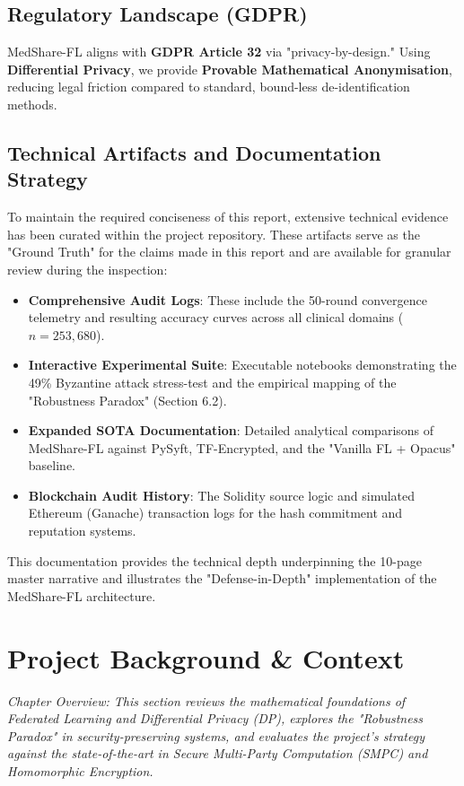 \documentclass[10pt, a4paper, twocolumn]{article}
\begin{document}
\subsection{Regulatory Landscape (GDPR)}
MedShare-FL aligns with \textbf{GDPR Article 32} via "privacy-by-design." Using \textbf{Differential Privacy}, we provide \textbf{Provable Mathematical Anonymisation}, reducing legal friction compared to standard, bound-less de-identification methods.

\subsection{Technical Artifacts and Documentation Strategy}
To maintain the required conciseness of this report, extensive technical evidence has been curated within the project repository. These artifacts serve as the "Ground Truth" for the claims made in this report and are available for granular review during the inspection:
\begin{itemize}[leftmargin=*, nosep]
    \item \textbf{Comprehensive Audit Logs}: These include the 50-round convergence telemetry and resulting accuracy curves across all clinical domains ($n=253,680$).
    \item \textbf{Interactive Experimental Suite}: Executable notebooks demonstrating the 49\% Byzantine attack stress-test and the empirical mapping of the "Robustness Paradox" (Section 6.2).
    \item \textbf{Expanded SOTA Documentation}: Detailed analytical comparisons of MedShare-FL against PySyft, TF-Encrypted, and the "Vanilla FL + Opacus" baseline.
    \item \textbf{Blockchain Audit History}: The Solidity source logic and simulated Ethereum (Ganache) transaction logs for the hash commitment and reputation systems.
\end{itemize}
This documentation provides the technical depth underpinning the 10-page master narrative and illustrates the "Defense-in-Depth" implementation of the MedShare-FL architecture.

\section{Project Background \& Context}
\label{sec:litreview}

\textit{Chapter Overview: This section reviews the mathematical foundations of Federated Learning and Differential Privacy (DP), explores the "Robustness Paradox" in security-preserving systems, and evaluates the project's strategy against the state-of-the-art in Secure Multi-Party Computation (SMPC) and Homomorphic Encryption.}
\end{document}
